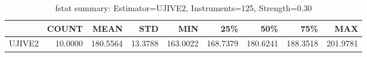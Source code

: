 \begin{table}[ht]
\centering
\caption{fstat summary: Estimator=UJIVE2, Instruments=125, Strength=0.30}
\begin{tabular}{lrrrrrrrr}
\toprule
 & COUNT & MEAN & STD & MIN & 25\% & 50\% & 75\% & MAX \\
\midrule
UJIVE2 & 10.0000 & 180.5564 & 13.3788 & 163.0022 & 168.7379 & 180.6241 & 188.3518 & 201.9781 \\
\bottomrule
\end{tabular}
\end{table}
